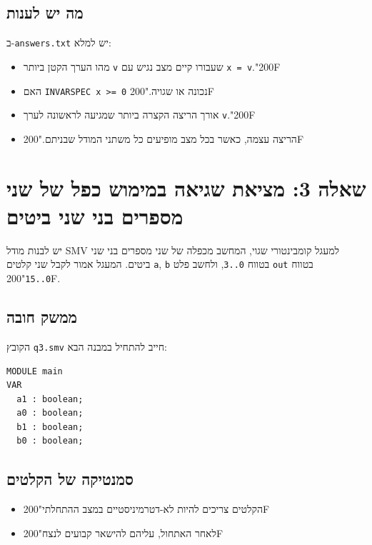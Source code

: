 \documentclass[11pt,a4paper]{article}
\newcommand{\RLM}{\char"200F}
\newenvironment{englishlisting}
  {\begin{english}\begin{flushleft}}
  {\end{flushleft}\end{english}}
\begin{document}
\subsection*{מה יש לענות}
ב-\texttt{answers.txt} יש למלא:
\begin{itemize}
  \item מהו הערך הקטן ביותר \texttt{v} שעבורו קיים מצב נגיש עם \texttt{x = v}.\RLM
  \item האם \texttt{INVARSPEC x >= 0} נכונה או שגויה.\RLM
  \item אורך הריצה הקצרה ביותר שמגיעה לראשונה לערך \texttt{v}.\RLM
  \item הריצה עצמה, כאשר בכל מצב מופיעים כל משתני המודל שבניתם.\RLM
\end{itemize}

\clearpage
\section{שאלה 3: מציאת שגיאה במימוש כפל של שני מספרים בני שני ביטים}
יש לבנות מודל \textenglish{SMV} למעגל קומבינטורי שגוי, המחשב מכפלה של שני מספרים בני שני ביטים.
המעגל אמור לקבל שני קלטים \texttt{a}, \texttt{b} בטווח \texttt{0..3}, ולחשב פלט \texttt{out} בטווח \texttt{0..15}\RLM.

\subsection*{ממשק חובה}
הקובץ \texttt{q3.smv} חייב להתחיל במבנה הבא:
\begin{englishlisting}
\begin{lstlisting}
MODULE main
VAR
  a1 : boolean;
  a0 : boolean;
  b1 : boolean;
  b0 : boolean;
\end{lstlisting}
\end{englishlisting}

\subsection*{סמנטיקה של הקלטים}
\begin{itemize}
  \item הקלטים צריכים להיות לא-דטרמיניסטיים במצב ההתחלתי\RLM
  \item לאחר האתחול, עליהם להישאר קבועים לנצח\RLM
\end{itemize}
\end{document}
